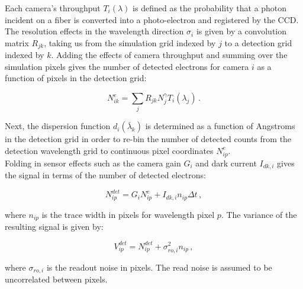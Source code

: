 Each camera's throughput $T_{i}(\lambda)$ is defined as the probability that a photon incident on a fiber is converted into a photo-electron and registered by the CCD. The resolution effects in the wavelength direction $\sigma_{i}$ is given by a convolution matrix $R_{jk}$, taking us from the simulation grid indexed by $j$ to a detection grid indexed by $k$. Adding the effects of camera throughput and summing over the simulation pixels gives the number of detected electrons for camera $i$ as a function of pixels in the detection grid:

\begin{equation}
    N_{ik}^{e} = \sum_{j}R_{jk}N_{j}^{\gamma}T_{i}(\lambda_{j})\,.
\end{equation}


Next, the dispersion function $d_i(\bar{\lambda}_{k})$ is determined as a function of Angstroms in the detection grid in order to re-bin the number of detected counts from the detection wavelength grid to continuous pixel coordinates $N_{ip}^{e}$.\\

Folding in sensor effects such as the camera gain $G_{i}$ and dark current $I_{dk,i}$ gives the signal in terms of the number of detected electrons:

\begin{equation}
    N_{ip}^{det} = G_{i}N_{ip}^{e} + I_{dk,i}n_{ip}\Delta t\,,
\end{equation}

where $n_{ip}$ is the trace width in pixels for wavelength pixel $p$. The variance of the resulting signal is given by:

\begin{equation}
    V_{ip}^{det} = N_{ip}^{det} + \sigma_{ro,i}^{2}n_{ip}\,,
\end{equation}

where $\sigma_{ro,i}$ is the readout noise in pixels. The read noise is assumed to be uncorrelated between pixels.\\



